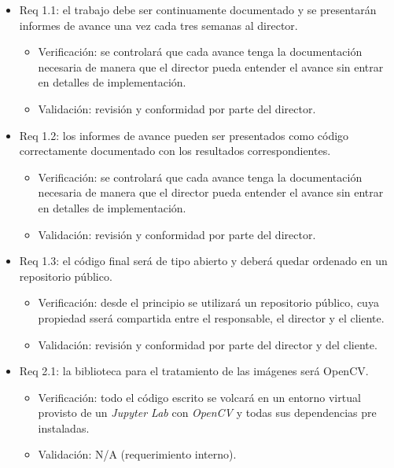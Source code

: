 \documentclass[
11pt, %
]{charter}
\begin{document}
\begin{itemize} 

\item Req 1.1: el trabajo debe ser continuamente documentado y se presentarán informes de avance una vez cada tres semanas al director.
\begin{itemize}
	\item Verificación: se controlará que cada avance tenga la documentación necesaria de manera que el director pueda entender el avance sin entrar en detalles de implementación. 
	\item Validación: revisión y conformidad por parte del director.
\end{itemize}

\item Req 1.2: los informes de avance pueden ser presentados como código correctamente documentado con los resultados correspondientes.
\begin{itemize}
	\item Verificación: se controlará que cada avance tenga la documentación necesaria de manera que el director pueda entender el avance sin entrar en detalles de implementación.
	\item Validación: revisión y conformidad por parte del director.
\end{itemize}

\item Req 1.3: el código final será de tipo abierto y deberá quedar ordenado en un repositorio público.
\begin{itemize}
	\item Verificación: desde el principio se utilizará un repositorio público, cuya propiedad sserá compartida entre el responsable, el director y el cliente.
	\item Validación: revisión y conformidad por parte del director y del cliente.
\end{itemize}

\item Req 2.1: la biblioteca para el tratamiento de las imágenes será OpenCV.
\begin{itemize}
	\item Verificación: todo el código escrito se volcará en un entorno virtual provisto de un \emph{Jupyter Lab} con \emph{OpenCV} y todas sus dependencias pre instaladas.
	\item Validación: N/A (requerimiento interno).
\end{itemize}


\end{itemize}
\end{document}
